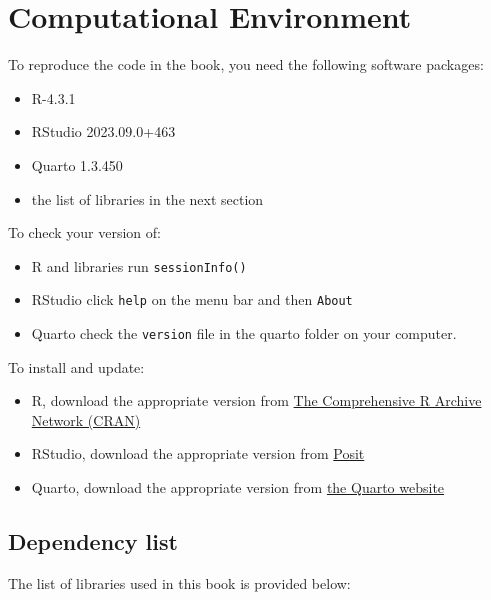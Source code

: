 \documentclass[
  letterpaper,
  DIV=11,
  numbers=noendperiod,
  oneside]{scrreprt}
\providecommand{\tightlist}{%
  \setlength{\itemsep}{0pt}\setlength{\parskip}{0pt}}\usepackage{longtable,booktabs,array}
\begin{document}
\section{Computational Environment}\label{computational-environment}

To reproduce the code in the book, you need the following software
packages:

\begin{itemize}
\tightlist
\item
  R-4.3.1
\item
  RStudio 2023.09.0+463
\item
  Quarto 1.3.450
\item
  the list of libraries in the next section
\end{itemize}

To check your version of:

\begin{itemize}
\tightlist
\item
  R and libraries run \texttt{sessionInfo()}
\item
  RStudio click \texttt{help} on the menu bar and then \texttt{About}
\item
  Quarto check the \texttt{version} file in the quarto folder on your
  computer.
\end{itemize}

To install and update:

\begin{itemize}
\tightlist
\item
  R, download the appropriate version from
  \href{https://cran.r-project.org}{The Comprehensive R Archive Network
  (CRAN)}
\item
  RStudio, download the appropriate version from
  \href{https://posit.co/download/rstudio-desktop/}{Posit}
\item
  Quarto, download the appropriate version from
  \href{https://quarto.org/docs/get-started/}{the Quarto website}
\end{itemize}

\subsection{Dependency list}\label{sec-dependencies}

The list of libraries used in this book is provided below:
\end{document}
